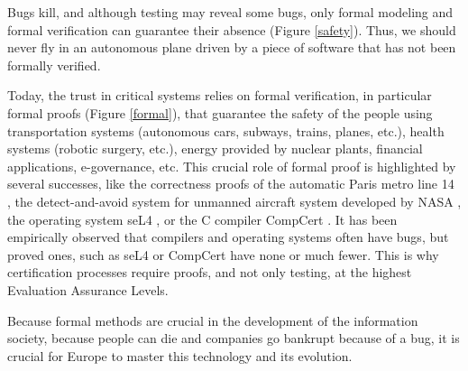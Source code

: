 \thispagestyle{empty}

Bugs kill, and although testing may reveal some bugs, only formal
modeling and formal verification can guarantee their absence (Figure
\ref{safety}).  Thus, we should never fly in an autonomous plane driven by a
piece of software that has not been formally verified.

Today, the trust in critical systems relies on formal verification, in
particular formal proofs (Figure \ref{formal}), that guarantee the
safety of the people using transportation systems (autonomous cars,
subways, trains, planes, etc.), health systems (robotic surgery,
etc.), energy provided by nuclear plants, financial applications,
e-governance, etc. This crucial role of formal proof is highlighted by
several successes, like the correctness proofs of the automatic Paris
metro line 14 \cite{metro14}, the detect-and-avoid system for unmanned
aircraft system developed by NASA \cite{Munoz16}, the operating system
seL4 \cite{Klein09}, or the C compiler CompCert \cite{Leroy06}.  It
has been empirically observed that compilers and operating systems
often have bugs, but proved ones, such as seL4 or CompCert have none
or much fewer.  This is why certification processes require proofs,
and not only testing, at the highest Evaluation Assurance Levels.

Because formal methods are crucial in the development of the
information society, because people can die and companies go bankrupt
because of a bug, it is crucial for Europe to master this technology
and its evolution.

